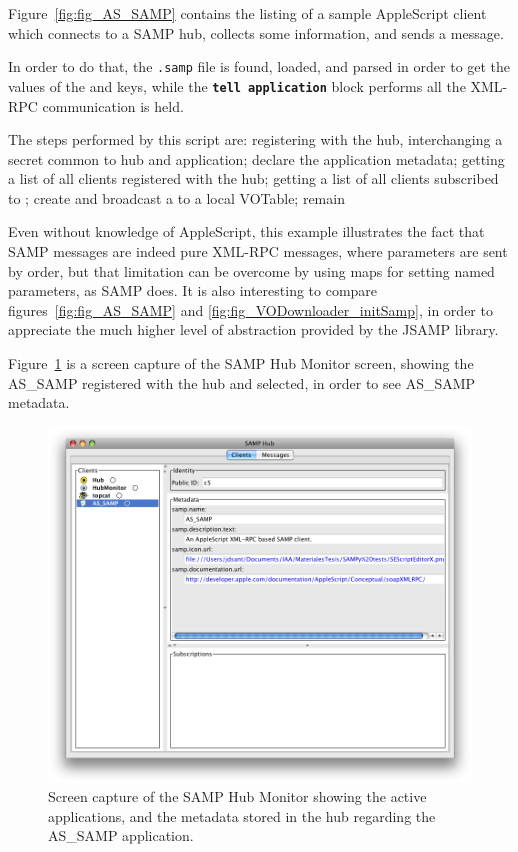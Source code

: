 		Figure~\ref{fig:fig_AS_SAMP} contains the listing of a
		sample AppleScript client which connects to a SAMP hub,
		collects some information, and sends a
		 message.
		
		In order to do that, the \texttt{.samp} file is found,
		loaded, and parsed in order to
		get the values of the  and
		 keys, while the
		\textbf{\texttt{tell application}} block performs all
		the XML-RPC communication is held.
		
		The steps performed by this script are: registering with
		the hub, interchanging a secret common to hub and
		application; declare the application metadata; getting a
		list of all clients registered with the hub; getting a
		list of all clients subscribed to
		; create and broadcast a
		 to a local VOTable; remain
		
		Even without knowledge of AppleScript, this example
		illustrates the fact that SAMP messages are
		indeed pure XML-RPC messages, where parameters are sent
		by order, but that limitation can be overcome by using
		maps for setting named parameters, as SAMP does.
		It is also interesting to
		compare figures~\ref{fig:fig_AS_SAMP} and
		\ref{fig:fig_VODownloader_initSamp}, in order to appreciate
		the much higher level of abstraction provided by the JSAMP
		library.
		
		Figure~\ref{fig:fig_AS_SAMP_hub}
		is a screen capture of the SAMP Hub Monitor screen,
		showing the AS\_SAMP registered with the hub and selected,
		in order to see AS\_SAMP metadata.
		
		\begin{figure}[tbp]
			\centering
				\includegraphics[height=0.4\textheight]
				{fig/AS_SAMP_hub.png}
			\caption[AS\_SAMP AppleScript client]
			{
				Screen capture of the SAMP Hub Monitor showing the
				active applications, and the metadata stored in the hub
				regarding the AS\_SAMP application.
			}
			\label{fig:fig_AS_SAMP_hub}
		\end{figure}
		
